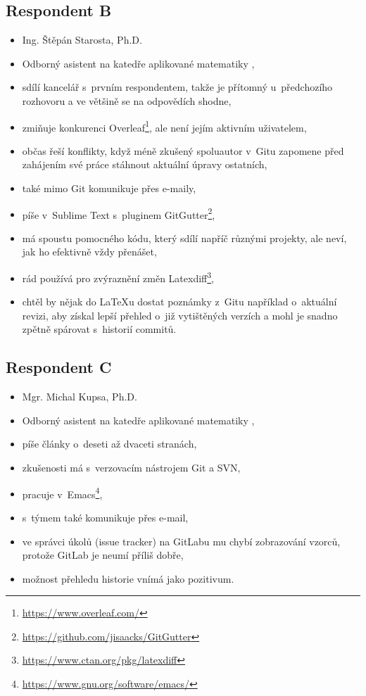 \subsection{Respondent B}

\begin{itemize}
	\item Ing. Štěpán Starosta, Ph.D.
	\item Odborný asistent na katedře aplikované matematiky \cite{kam},
	\item sdílí kancelář s~prvním respondentem, takže je přítomný u~předchozího rozhovoru a ve většině se na odpovědích shodne,
	\item zmiňuje konkurenci Overleaf\footnote{\url{https://www.overleaf.com/}}, ale není jejím aktivním uživatelem,
	\item občas řeší konflikty, když méně zkušený spoluautor v~Gitu zapomene před zahájením své práce stáhnout aktuální úpravy ostatních,
	\item také mimo Git komunikuje přes e-maily,
	\item píše v~Sublime Text s~pluginem GitGutter\footnote{\url{https://github.com/jisaacks/GitGutter}},
	\item má spoustu pomocného kódu, který sdílí napříč různými projekty, ale neví, jak ho efektivně vždy přenášet,
	\item rád používá pro zvýraznění změn Latexdiff\footnote{\url{https://www.ctan.org/pkg/latexdiff}},
	\item chtěl by nějak do \LaTeX{u} dostat poznámky z~Gitu například o~aktuální revizi, aby získal lepší přehled o~již vytištěných verzích a mohl je snadno zpětně spárovat s~historií commitů.
\end{itemize}


\subsection{Respondent C}

\begin{itemize}
	\item Mgr. Michal Kupsa, Ph.D.
	\item Odborný asistent na katedře aplikované matematiky \cite{kam},
	\item píše články o~deseti až dvaceti stranách,
	\item zkušenosti má s~verzovacím nástrojem Git a SVN,
	\item pracuje v~Emacs\footnote{\url{https://www.gnu.org/software/emacs/}},
	\item s~týmem také komunikuje přes e-mail,
	\item ve správci úkolů (issue tracker) na GitLabu mu chybí zobrazování vzorců, protože GitLab je neumí příliš dobře,
	\item možnost přehledu historie vnímá jako pozitivum.
\end{itemize}



